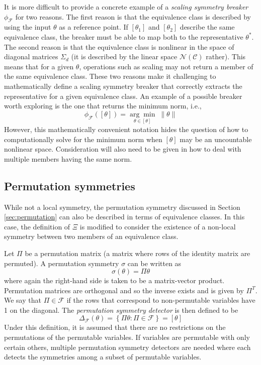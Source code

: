 It is more difficult to provide a concrete example of a \textit{scaling symmetry breaker} $\phi_\mathcal{F}$ for two reasons. The first reason is that the equivalence class is described by using the input $\theta$ as a reference point. If $[\theta_1]$ and $[\theta_2]$ describe the same equivalence class, the breaker must be able to map both to the representative $\theta^*$. The second reason is that the equivalence class is nonlinear in the space of diagonal matrices $\Sigma_d$ (it is described by the linear space $\mathcal{N}(\mathcal{C})$ rather). This means that for a given $\theta$, operations such as scaling may not return a member of the same equivalence class. These two reasons make it challenging to mathematically define a scaling symmetry breaker that correctly extracts the representative for a given equivalence class. An example of a possible breaker worth exploring is the one that returns the minimum norm, i.e.,
\[
\phi_\mathcal{F}([\theta]) = \underset{\theta\in[\theta]}{\arg\min}\;\|\theta\|
\]
However, this mathematically convenient notation hides the question of how to computationally solve for the minimum norm when $[\theta]$ may be an uncountable nonlinear space. Consideration will also need to be given in how to deal with multiple members having the same norm.


\subsection{Permutation symmetries}

While not a local symmetry, the permutation symmetry discussed in Section \ref{sec:permutation} can also be described in terms of equivalence classes. In this case, the definition of $\Xi$ is modified to consider the existence of a non-local symmetry between two members of an equivalence class. 

\begin{defn}
Let $\Pi$ be a permutation matrix (a matrix where rows of the identity matrix are permuted). A permutation symmetry $\sigma$ can be written as
\[
\sigma(\theta)=\Pi\theta
\]
where again the right-hand side is taken to be a matrix-vector product. Permutation matrices are orthogonal and so the inverse exists and is given by $\Pi^T$. We say that $\Pi\in\mathcal{F}$ if the rows that correspond to non-permutable variables have 1 on the diagonal. The \textit{permutation symmetry detector} is then defined to be
\[
\Delta_\mathcal{F}(\theta) = \left\{\Pi\theta:\Pi\in\mathcal{F}\right\} = [\theta]
\]
Under this definition, it is assumed that there are no restrictions on the permutations of the permutable variables. If variables are permutable with only certain others, multiple permutation symmetry detectors are needed where each detects the symmetries among a subset of permutable variables.
\end{defn}

